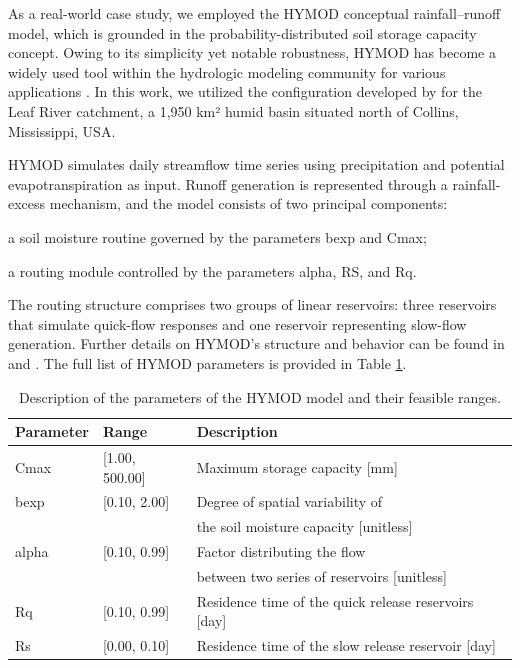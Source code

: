 \documentclass[12pt]{article}
\begin{document}
As a real-world case study, we employed the HYMOD conceptual rainfall--runoff model, which is grounded in the probability-distributed soil storage capacity concept. Owing to its simplicity yet notable robustness, HYMOD has become a widely used tool within the hydrologic modeling community for various applications \citep{sheikholeslami2017progressive}. In this work, we utilized the configuration developed by \cite{vrugt2003shuffled} for the Leaf River catchment, a 1,950 km² humid basin situated north of Collins, Mississippi, USA.

HYMOD simulates daily streamflow time series using precipitation and potential evapotranspiration as input. Runoff generation is represented through a rainfall-excess mechanism, and the model consists of two principal components:
\begin{inparaenum}[i)]
    \item a soil moisture routine governed by the parameters bexp and Cmax;
    \item a routing module controlled by the parameters alpha, RS, and Rq.
\end{inparaenum}
The routing structure comprises two groups of linear reservoirs: three reservoirs that simulate quick-flow responses and one reservoir representing slow-flow generation. Further details on HYMOD's structure and behavior can be found in \cite{boyle2000toward} and \cite{wagener2001framework}. The full list of HYMOD parameters is provided in Table \ref{tab:HYMOD}.

\begin{table}[H]
\centering
\begin{tabular}{@{}lll@{}} \toprule
Parameter & Range          & Description                                          \\ \midrule
Cmax      & [1.00, 500.00] & Maximum storage capacity [mm]                        \\
bexp      & [0.10, 2.00]   & Degree of spatial variability of                     \\
          &                & the soil moisture capacity [unitless]                \\
alpha     & [0.10, 0.99]   & Factor distributing the flow                         \\
          &                & between two series of reservoirs [unitless]          \\
Rq        & [0.10, 0.99]   & Residence time of the quick release reservoirs [day] \\
Rs        & [0.00, 0.10]   & Residence time of the slow release reservoir [day]   \\
\bottomrule
\end{tabular}
\caption{Description of the parameters of the HYMOD model and their feasible ranges.}
\label{tab:HYMOD}
\end{table}
\end{document}
